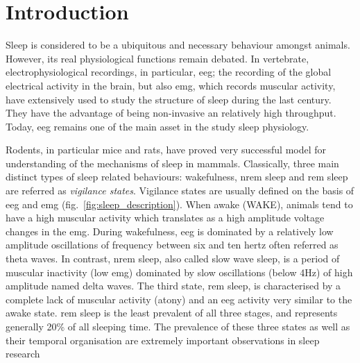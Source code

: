 \section{Introduction} \label{intro}

Sleep is considered to be a ubiquitous and necessary behaviour amongst animals.
However, its real physiological functions remain debated.
In vertebrate, electrophysiological recordings, in particular, \gls{eeg};
the recording of the global electrical activity in the brain,
but also \gls{emg}, which records muscular activity,
have extensively used to study the structure of sleep during the last century.
They have the advantage of being non-invasive an relatively high throughput.
Today, \gls{eeg} remains one of the main asset in the study sleep physiology.

Rodents, in particular mice and rats, have proved very successful model for understanding of the mechanisms of sleep in mammals.
Classically, three main distinct types of sleep related behaviours: wakefulness, \gls{nrem} sleep and \gls{rem} 
sleep are referred as \emph{vigilance states}.
Vigilance states are usually defined on the basis of \gls{eeg} and \gls{emg} (fig.~\ref{fig:sleep_description}).
When awake (WAKE), animals tend to have a high muscular activity which translates as a high amplitude voltage changes in the \gls{emg}.
During wakefulness, \gls{eeg} is dominated by a relatively low amplitude oscillations of frequency
between six and ten hertz often referred as theta waves.
In contrast, \gls{nrem} sleep, also called slow wave sleep, is a period of muscular inactivity (low \gls{emg})
dominated by slow oscillations (below 4Hz) of high amplitude named delta waves.
The third state, \gls{rem} sleep, is characterised by a complete lack of muscular activity (atony) and an \gls{eeg} activity very similar to the awake state.
\gls{rem} sleep is the least prevalent of all three stages, and represents generally  20\% of all sleeping time.
The prevalence of these three states as well as their temporal organisation are extremely important observations in sleep research




